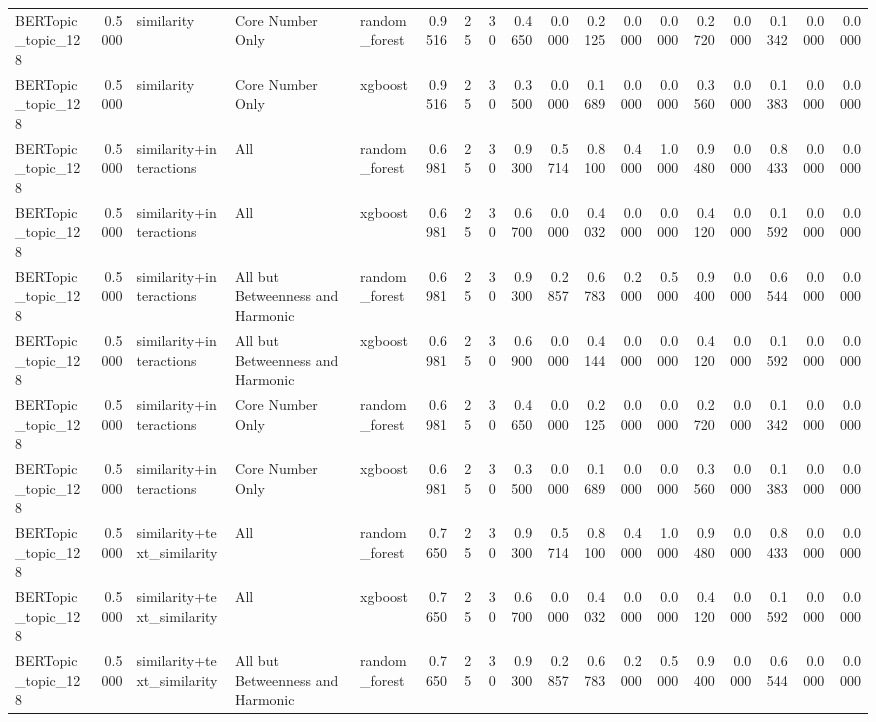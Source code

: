 \begin{tabular}{lrlllrrrrrrrrrrrrr}
BERTopic_topic_128 & 0.5000 & similarity & Core Number Only & random_forest & 0.9516 & 25 & 30 & 0.4650 & 0.0000 & 0.2125 & 0.0000 & 0.0000 & 0.2720 & 0.0000 & 0.1342 & 0.0000 & 0.0000 \\
BERTopic_topic_128 & 0.5000 & similarity & Core Number Only & xgboost & 0.9516 & 25 & 30 & 0.3500 & 0.0000 & 0.1689 & 0.0000 & 0.0000 & 0.3560 & 0.0000 & 0.1383 & 0.0000 & 0.0000 \\
BERTopic_topic_128 & 0.5000 & similarity+interactions & All & random_forest & 0.6981 & 25 & 30 & 0.9300 & 0.5714 & 0.8100 & 0.4000 & 1.0000 & 0.9480 & 0.0000 & 0.8433 & 0.0000 & 0.0000 \\
BERTopic_topic_128 & 0.5000 & similarity+interactions & All & xgboost & 0.6981 & 25 & 30 & 0.6700 & 0.0000 & 0.4032 & 0.0000 & 0.0000 & 0.4120 & 0.0000 & 0.1592 & 0.0000 & 0.0000 \\
BERTopic_topic_128 & 0.5000 & similarity+interactions & All but Betweenness and Harmonic & random_forest & 0.6981 & 25 & 30 & 0.9300 & 0.2857 & 0.6783 & 0.2000 & 0.5000 & 0.9400 & 0.0000 & 0.6544 & 0.0000 & 0.0000 \\
BERTopic_topic_128 & 0.5000 & similarity+interactions & All but Betweenness and Harmonic & xgboost & 0.6981 & 25 & 30 & 0.6900 & 0.0000 & 0.4144 & 0.0000 & 0.0000 & 0.4120 & 0.0000 & 0.1592 & 0.0000 & 0.0000 \\
BERTopic_topic_128 & 0.5000 & similarity+interactions & Core Number Only & random_forest & 0.6981 & 25 & 30 & 0.4650 & 0.0000 & 0.2125 & 0.0000 & 0.0000 & 0.2720 & 0.0000 & 0.1342 & 0.0000 & 0.0000 \\
BERTopic_topic_128 & 0.5000 & similarity+interactions & Core Number Only & xgboost & 0.6981 & 25 & 30 & 0.3500 & 0.0000 & 0.1689 & 0.0000 & 0.0000 & 0.3560 & 0.0000 & 0.1383 & 0.0000 & 0.0000 \\
BERTopic_topic_128 & 0.5000 & similarity+text_similarity & All & random_forest & 0.7650 & 25 & 30 & 0.9300 & 0.5714 & 0.8100 & 0.4000 & 1.0000 & 0.9480 & 0.0000 & 0.8433 & 0.0000 & 0.0000 \\
BERTopic_topic_128 & 0.5000 & similarity+text_similarity & All & xgboost & 0.7650 & 25 & 30 & 0.6700 & 0.0000 & 0.4032 & 0.0000 & 0.0000 & 0.4120 & 0.0000 & 0.1592 & 0.0000 & 0.0000 \\
BERTopic_topic_128 & 0.5000 & similarity+text_similarity & All but Betweenness and Harmonic & random_forest & 0.7650 & 25 & 30 & 0.9300 & 0.2857 & 0.6783 & 0.2000 & 0.5000 & 0.9400 & 0.0000 & 0.6544 & 0.0000 & 0.0000 \\

\end{tabular}
